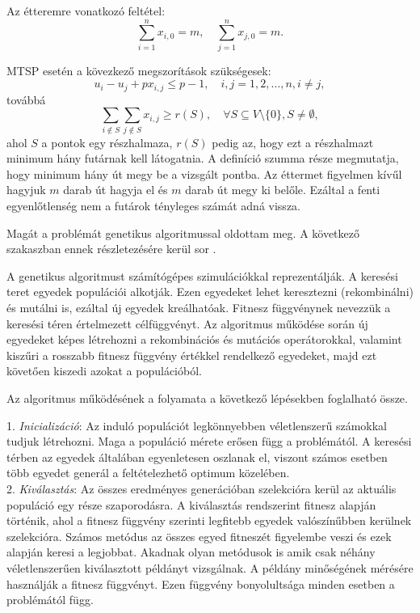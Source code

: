 Az étteremre vonatkozó feltétel:
\[
\displaystyle
\sum_{i=1}^n x_{i, 0} = m, \quad
\sum_{j=1}^n x_{j, 0} = m.
\]

MTSP esetén a kövezkező megszorítások szükségesek:
\[
u_i - u_j + p x_{i,j} \leq p - 1, \quad i, j = 1, 2, \ldots, n, i \neq j,
\]
továbbá
\[
\displaystyle
\sum_{i \notin S} \sum_{j \notin S} x_{i,j} \geq r(S), \quad
\forall S \subseteq V \setminus \{0\}, S \neq \emptyset,
\]
ahol $S$ a pontok egy részhalmaza, $r(S)$ pedig az, hogy ezt a részhalmazt minimum hány futárnak kell látogatnia. A definíció szumma része megmutatja, hogy minimum hány út megy be a vizsgált pontba. Az éttermet figyelmen kívűl hagyjuk $m$ darab út hagyja el és $m$ darab út megy ki belőle. Ezáltal a fenti egyenlőtlenség nem a futárok tényleges számát adná vissza.

Magát a problémát genetikus algoritmussal oldottam meg. A következő szakaszban ennek részletezésére kerül sor \cite{MTSP2}.


A genetikus algoritmust számítógépes szimulációkkal reprezentálják. A keresési teret egyedek populációi alkotják. Ezen egyedeket lehet keresztezni (rekombinálni) és mutálni is, ezáltal új egyedek kreálhatóak. Fitnesz függvénynek nevezzük a keresési téren értel\-mezett célfüggvényt. Az algoritmus működése során új egyedeket képes létrehozni a rekombinációs és mutációs operátorokkal, valamint kiszűri a rosszabb fitnesz függvény értékkel rendelkező egyedeket, majd ezt követően kiszedi azokat a populációból.

Az algoritmus működésének a folyamata a következő lépésekben foglalható össze.

1. \textit{Inicializáció}:  Az induló populációt legkönnyebben véletlenszerű számokkal tudjuk létrehozni. Maga a populáció mérete erősen függ a problémától. A keresési térben az egyedek általában egyenletesen oszlanak el, viszont számos esetben több egyedet generál a feltételezhető optimum közelében. \\

2. \textit{Kiválasztás}: Az összes eredményes generációban szelekcióra kerül az aktuális populáció egy része szaporodásra. A kiválasztás rendszerint fitnesz alapján történik, ahol a fitnesz függvény szerinti legfitebb egyedek valószínűbben kerülnek szelekcióra. Számos metódus az összes egyed fitneszét figyelembe veszi és ezek alapján keresi a legjobbat. Akadnak olyan metódusok is amik csak néhány véletlenszerűen kiválasztott példányt vizsgálnak. A példány minőségének mérésére használják a fitnesz függvényt. Ezen függvény bonyolultsága minden esetben a problémától függ. \\

